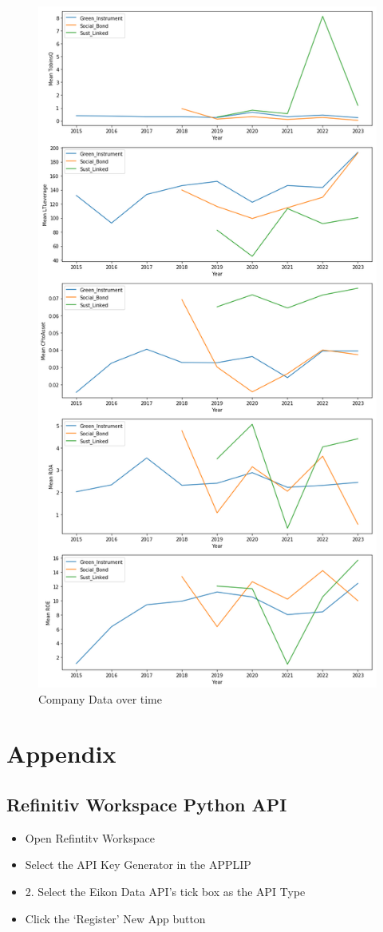 \documentclass[12pt, a4paper]{article}
\begin{document}
\begin{figure}[H]
    \centering
    \includegraphics[width=0.8\linewidth, height=0.8\textheight, keepaspectratio]{Company_Data_overtime.png}
    \caption{Company Data over time}
\label{fig:CompanyTime}
\end{figure}

\newpage



\section{Appendix}
\subsection{Refinitiv Workspace Python API}
\begin{itemize}
    \item Open Refintitv Workspace
    \item Select the API Key Generator in the APPLIP
    \item 2. Select the Eikon Data API's tick box as the API Type
    \item Click the ‘Register’ New App button
\end{itemize}
\end{document}

